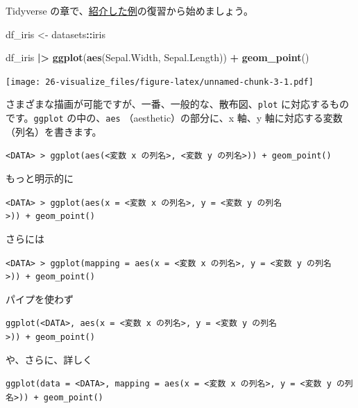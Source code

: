 \documentclass[
  xelatex, ja=standard]{bxjsbook}
\newenvironment{Shaded}{\begin{snugshade}}{\end{snugshade}}
\newcommand{\FunctionTok}[1]{\textcolor[rgb]{0.13,0.29,0.53}{\textbf{#1}}}
\newcommand{\NormalTok}[1]{#1}
\newcommand{\OtherTok}[1]{\textcolor[rgb]{0.56,0.35,0.01}{#1}}
\newcommand{\SpecialCharTok}[1]{\textcolor[rgb]{0.81,0.36,0.00}{\textbf{#1}}}
\theoremstyle{definition}
\theoremstyle{definition}
\theoremstyle{definition}
\theoremstyle{definition}
\theoremstyle{remark}
\begin{document}
Tidyverse の章で、\href{https://icu-hsuzuki.github.io/ds4aj/tidyverse.html\#ggplot2-グラフの描画}{紹介した例}の復習から始めましょう。

\begin{Shaded}
\begin{Highlighting}[]
\NormalTok{df\_iris }\OtherTok{\textless{}{-}}\NormalTok{ datasets}\SpecialCharTok{::}\NormalTok{iris}
\end{Highlighting}
\end{Shaded}

\begin{Shaded}
\begin{Highlighting}[]
\NormalTok{df\_iris }\SpecialCharTok{|\textgreater{}} \FunctionTok{ggplot}\NormalTok{(}\FunctionTok{aes}\NormalTok{(Sepal.Width, Sepal.Length)) }\SpecialCharTok{+} \FunctionTok{geom\_point}\NormalTok{()}
\end{Highlighting}
\end{Shaded}

\texttt{[image: 26-visualize\_files/figure-latex/unnamed-chunk-3-1.pdf]}

さまざまな描画が可能ですが、一番、一般的な、散布図、\texttt{plot} に対応するものです。\texttt{ggplot} の中の、\texttt{aes} （aesthetic）の部分に、x 軸、y 軸に対応する変数（列名）を書きます。

\texttt{\textless{}DATA\textgreater{}\ \textbar{}\textgreater{}\ ggplot(aes(\textless{}変数\ x\ の列名\textgreater{},\ \textless{}変数\ y\ の列名\textgreater{}))\ +\ geom\_point()}

もっと明示的に

\texttt{\textless{}DATA\textgreater{}\ \textbar{}\textgreater{}\ ggplot(aes(x\ =\ \textless{}変数\ x\ の列名\textgreater{},\ y\ =\ \textless{}変数\ y\ の列名\textgreater{}))\ +\ geom\_point()}

さらには

\texttt{\textless{}DATA\textgreater{}\ \textbar{}\textgreater{}\ ggplot(mapping\ =\ aes(x\ =\ \textless{}変数\ x\ の列名\textgreater{},\ y\ =\ \textless{}変数\ y\ の列名\textgreater{}))\ +\ geom\_point()}

パイプを使わず

\texttt{ggplot(\textless{}DATA\textgreater{},\ aes(x\ =\ \textless{}変数\ x\ の列名\textgreater{},\ y\ =\ \textless{}変数\ y\ の列名\textgreater{}))\ +\ geom\_point()}

や、さらに、詳しく

\texttt{ggplot(data\ =\ \textless{}DATA\textgreater{},\ mapping\ =\ aes(x\ =\ \textless{}変数\ x\ の列名\textgreater{},\ y\ =\ \textless{}変数\ y\ の列名\textgreater{}))\ +\ geom\_point()}
\end{document}
